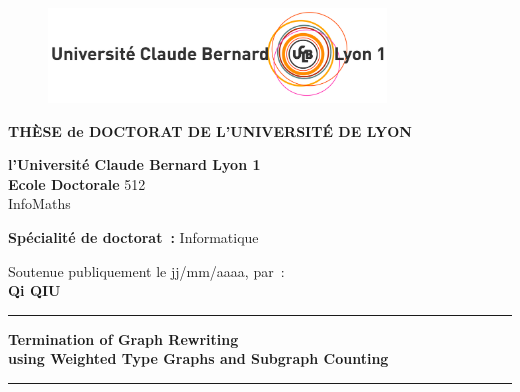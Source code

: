 
\begin{titlepage}

    \unitlength 1cm
    \begin{center}
    
    \vspace*{-2.5cm}
    \begin{figure}[h]
        \centering
        \includegraphics[width=0.8\textwidth]{LogoLyon1Off_CoulCmjn300dpi.jpg}
    \end{figure}
    
               {\large\bf THÈSE de DOCTORAT DE L'UNIVERSITÉ DE LYON\\}
   
               {\large \bf l'Université Claude Bernard Lyon 1\\}
    \vspace{12pt}
               {\large \textbf{Ecole Doctorale} 512 \\InfoMaths}

    \vspace{12pt}
    
               {\large \textbf{Spécialité de doctorat~:} Informatique \\}
    
    \vspace{0.8cm}
    
               {Soutenue publiquement le jj/mm/aaaa, par~:\\}
               {\Large\bf {Qi QIU}}
    \vspace{0.5cm}           
    
    
    \rule{5cm}{1pt}
    
    \vspace{12pt}
               
               {\LARGE \bf Termination of Graph Rewriting}\\
               \vspace{0.3cm}
               {\Large \bf using Weighted Type Graphs and Subgraph Counting}
               
    \vspace{12pt}
    \rule{5cm}{1pt}
    

\end{center}
\end{titlepage}
